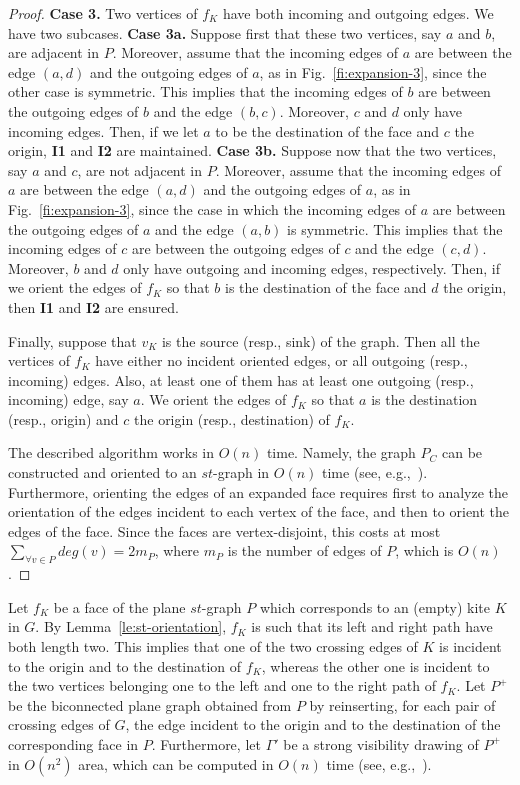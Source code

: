\documentclass[a4paper]{article}
\begin{document}
\begin{proof}
{\noindent \bf Case 3.} Two vertices of $f_K$  have both incoming and outgoing edges. We have two subcases. {\bf Case 3a.} Suppose first that these two vertices, say $a$ and $b$, are adjacent in $P$.   Moreover, assume that the incoming edges of $a$ are between the edge $(a,d)$ and the outgoing edges of $a$, as in Fig.~\ref{fi:expansion-3}, since the other case is symmetric. This implies that the incoming edges of $b$ are between the outgoing edges of $b$ and the edge $(b,c)$. Moreover, $c$ and $d$ only have incoming edges. Then, if we let $a$ to be the destination of the face and $c$ the origin, {\bf I1} and {\bf I2} are maintained. 
{\bf Case 3b.} Suppose now that the two vertices, say $a$ and $c$, are not adjacent in $P$. Moreover, assume that the incoming edges of $a$ are between the edge $(a,d)$ and the outgoing edges of $a$, as in Fig.~\ref{fi:expansion-3}, since the case in which the incoming edges of $a$ are between the outgoing edges of $a$ and the edge $(a,b)$ is symmetric. This implies that the incoming edges of $c$ are between the outgoing edges of $c$ and the edge $(c,d)$. Moreover, $b$ and $d$ only have outgoing and incoming edges, respectively. Then, if we orient the edges of $f_K$ so that $b$ is the destination of the face and $d$ the origin, then {\bf I1} and {\bf I2} are ensured.

\medskip

Finally, suppose that $v_K$ is the source (resp., sink) of the graph. Then all the vertices of $f_K$ have either no incident oriented edges, or all outgoing (resp., incoming) edges. Also, at least one of them has at least one outgoing (resp., incoming) edge, say $a$. We orient the edges of $f_K$ so that $a$ is the destination (resp., origin) and $c$ the origin (resp., destination) of $f_K$. 

\medskip

The described algorithm works in $O(n)$ time. Namely, the graph $P_C$ can be constructed and oriented to an $st$-graph in $O(n)$ time (see, e.g.,~\cite{Even1976339}). Furthermore, orienting the edges of an expanded face requires first to analyze the orientation of the edges incident to each vertex of the face, and then to orient the edges of the face. Since the faces are vertex-disjoint, this costs at most $\sum_{\forall v \in P}deg(v)=2m_P$, where $m_P$ is the number of edges of $P$, which is $O(n)$.
\end{proof}

Let $f_K$ be a face of the plane $st$-graph $P$ which corresponds to an (empty) kite $K$ in $G$. By Lemma~\ref{le:st-orientation}, $f_K$ is such that its left and right path have both length two. This implies that one of the two crossing edges of $K$ is incident to the origin and to the destination of $f_K$, whereas the other one is incident to the two vertices belonging one to the left and one to the right path of $f_K$. Let $P^+$ be the biconnected plane graph obtained from $P$ by reinserting, for each pair of crossing edges of $G$, the edge incident to the origin and to the destination of the corresponding face in $P$. Furthermore, let $\Gamma'$ be a strong visibility drawing of $P^+$ in $O(n^2)$ area, which can be computed in $O(n)$ time (see, e.g.,~\cite{TamassiaTollis86}).
\end{document}
